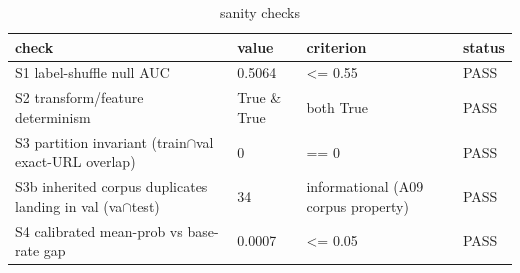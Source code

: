 \begin{table}[htbp]
\caption{sanity checks}
\label{tab:sanity_checks}
\begin{tabular}{llll}
\toprule
check & value & criterion & status \\
\midrule
S1 label-shuffle null AUC & 0.5064 & <= 0.55 & PASS \\
S2 transform/feature determinism & True \& True & both True & PASS \\
S3 partition invariant (train$\cap$val exact-URL overlap) & 0 & == 0 & PASS \\
S3b inherited corpus duplicates landing in val (va$\cap$test) & 34 & informational (A09 corpus property) & PASS \\
S4 calibrated mean-prob vs base-rate gap & 0.0007 & <= 0.05 & PASS \\
\bottomrule
\end{tabular}
\end{table}

